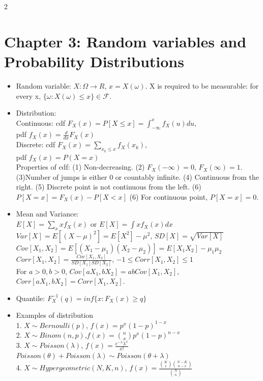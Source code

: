 \documentclass[a4paper,10pt]{article}
\begin{document}
\begin{multicols}{2}
\section*{Chapter 3: Random variables and Probability Distributions}
\begin{itemize}
    \item Random variable: $X:\Omega\to R$, $x=X(\omega)$. X is required to be measurable: for every x, $\{\omega:X(\omega)\le x\}\in \mathcal{F}$.
    \item Distribution:\\
    Continuous: cdf $F_X(x)=P[X\le x]=\int_{-\infty}^xf_X(u)du$,\\ pdf $f_X(x)=\frac{d}{dx}F_X(x)$\\
    Discrete: cdf $F_X(x)=\sum_{x_k\le x}f_X(x_k)$,\\ pdf $f_X(x)=P(X=x)$\\
    Properties of cdf: (1) Non-decreasing. (2) $F_X(-\infty)=0$, $F_X(\infty)=1$. (3)Number of jumps is either 0 or countably infinite. (4) Continuous from the right. (5) Discrete point is not continuous from the left. (6) $P[X=x]=F_X(x)-P[X<x]$ (6) For continuous point, $P[X=x]=0$.
    \item Mean and Variance:\\
    $E[X]=\sum_x xf_X(x)$ or $E[X]=\int xf_X(x)dx$\\
    $Var[X]=E[(X-\mu)^2]=E[X^2]-\mu^2$, $SD[X]=\sqrt{Var[X]}$\\
    $Cov[X_1,X_2]=E[(X_1-\mu_1)(X_2-\mu_2)]=E[X_1X_2]-\mu_1\mu_2$\\
    $Corr[X_1,X_2]=\frac{Cov[X_1,X_2]}{SD[X_1]SD[X_2]}$, $-1\le Corr[X_1,X_2]\le 1$\\
    For $a>0,b>0$, $Cov[aX_1,bX_2]=abCov[X_1,X_2]$,\\ $Corr[aX_1,bX_2]=Corr[X_1,X_2]$.
    \item Quantile: $F_X^{-1}(q)=inf\{x:F_X(x)\ge q\}$
    \item Examples of distribution\\
    1. $X\sim Bernoulli(p)$, $f(x)=p^x(1-p)^{1-x}$\\
    2. $X\sim Binom(n,p)$,$f(x)=\binom{n}{x}p^x(1-p)^{n-x}$\\
    3. $X\sim Poisson(\lambda)$, $f(x)=\frac{e^{-\lambda}\lambda^x}{x!}$\\
    $Poisson(\theta)+Poisson(\lambda)\sim Poisson(\theta+\lambda)$\\
    4. $X\sim Hypergeometric(N,K,n)$, $f(x)=\frac{\binom{K}{x}\binom{N-K}{n-x}}{\binom{N}{n}}$\\

\end{itemize}
\end{multicols}
\end{document}
